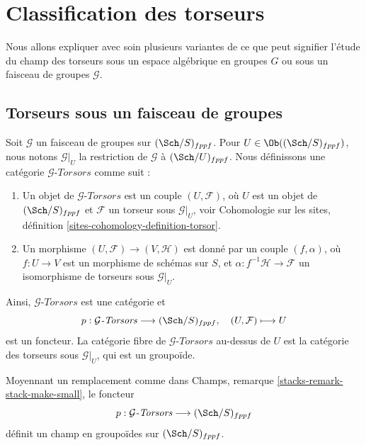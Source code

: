 \section{Classification des torseurs}
\label{section-torsors}

\noindent
Nous allons expliquer avec soin plusieurs variantes de ce que peut
signifier l'étude du champ des torseurs sous un espace algébrique en groupes $G$
ou sous un faisceau de groupes $\mathcal{G}$.



\subsection{Torseurs sous un faisceau de groupes}
\label{subsection-torsors-sheaf}

\noindent
Soit $\mathcal{G}$ un faisceau de groupes sur $(\Sch/S)_{fppf}$.
Pour $U \in \Ob((\Sch/S)_{fppf})$, nous notons
$\mathcal{G}|_U$ la restriction de $\mathcal{G}$ à $(\Sch/U)_{fppf}$.
Nous définissons une catégorie $\mathcal{G}\textit{-Torsors}$ comme suit :
\begin{enumerate}
\item Un objet de $\mathcal{G}\textit{-Torsors}$ est un couple
$(U, \mathcal{F})$, où $U$ est un objet de $(\Sch/S)_{fppf}$
et $\mathcal{F}$ un torseur sous $\mathcal{G}|_U$, voir
Cohomologie sur les sites, définition \ref{sites-cohomology-definition-torsor}.
\item Un morphisme $(U, \mathcal{F}) \to (V, \mathcal{H})$ est donné
par un couple $(f, \alpha)$, où $f : U \to V$ est un morphisme de schémas
sur $S$, et $\alpha : f^{-1}\mathcal{H} \to \mathcal{F}$ un
isomorphisme de torseurs sous $\mathcal{G}|_U$.
\end{enumerate}
Ainsi, $\mathcal{G}\textit{-Torsors}$ est une catégorie et
$$
p : \mathcal{G}\textit{-Torsors} \longrightarrow (\Sch/S)_{fppf},
\quad
(U, \mathcal{F}) \longmapsto U
$$
est un foncteur. La catégorie fibre de $\mathcal{G}\textit{-Torsors}$
au-dessus de $U$ est la catégorie des torseurs sous $\mathcal{G}|_U$, qui est un groupoïde.

\begin{lemma}
\label{lemma-torsors-sheaf-stack-in-groupoids}
Moyennant un remplacement comme dans
Champs, remarque \ref{stacks-remark-stack-make-small},
le foncteur
$$
p : \mathcal{G}\textit{-Torsors} \longrightarrow (\Sch/S)_{fppf}
$$
définit un champ en groupoïdes sur $(\Sch/S)_{fppf}$.
\end{lemma}

